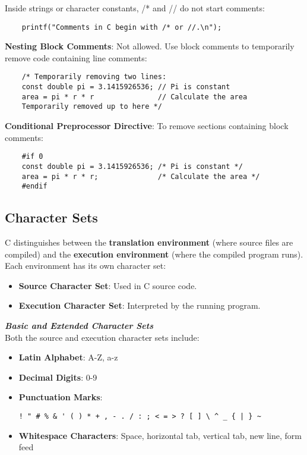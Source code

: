\begin{tcolorbox}[arc=5pt, boxrule=2pt, title=Notes]
    Inside strings or character constants, /* and // do not start comments:
    \begin{verbatim}
    printf("Comments in C begin with /* or //.\n");
    \end{verbatim}   
    \textbf{Nesting Block Comments}: Not allowed. Use block comments to temporarily remove code containing line comments:
    \begin{verbatim}
    /* Temporarily removing two lines:
    const double pi = 3.1415926536; // Pi is constant
    area = pi * r * r               // Calculate the area
    Temporarily removed up to here */
    \end{verbatim}   
    \textbf{Conditional Preprocessor Directive}: To remove sections containing block comments:
    \begin{verbatim}
    #if 0
    const double pi = 3.1415926536; /* Pi is constant */
    area = pi * r * r;              /* Calculate the area */
    #endif
    \end{verbatim}   
\end{tcolorbox}


\subsection{Character Sets}
C distinguishes between the \textbf{translation environment} (where source files are compiled) and the \textbf{execution environment} (where the compiled program runs). Each environment has its own character set:
\begin{itemize}
    \item \textbf{Source Character Set}: Used in C source code.
    \item \textbf{Execution Character Set}: Interpreted by the running program.
\end{itemize}
\textbf{\textit{Basic and Extended Character Sets}} \\
Both the source and execution character sets include:
\begin{itemize}
    \item \textbf{Latin Alphabet}: A-Z, a-z
    \item \textbf{Decimal Digits}: 0-9
    \item \textbf{Punctuation Marks}:
    \begin{lstlisting}[basicstyle=\ttfamily]
    ! " # % & ' ( ) * + , - . / : ; < = > ? [ ] \ ^ _ { | } ~
    \end{lstlisting}
    \item \textbf{Whitespace Characters}: Space, horizontal tab, vertical tab, new line, form feed
\end{itemize}

